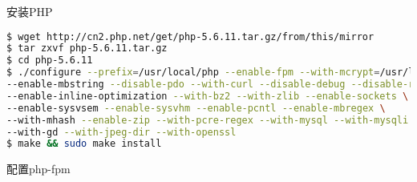 \begin{lstlisting}[language=bash]

\end{lstlisting}




\begin{lstlisting}[language=bash]

\end{lstlisting}









\begin{lstlisting}[language=bash]

\end{lstlisting}



\begin{lstlisting}[language=bash]

\end{lstlisting}








\begin{lstlisting}[language=bash]

\end{lstlisting}

















安装PHP


\begin{lstlisting}[language=bash]
$ wget http://cn2.php.net/get/php-5.6.11.tar.gz/from/this/mirror
$ tar zxvf php-5.6.11.tar.gz
$ cd php-5.6.11
$ ./configure --prefix=/usr/local/php --enable-fpm --with-mcrypt=/usr/local/libmcrypt \
--enable-mbstring --disable-pdo --with-curl --disable-debug --disable-rpath \
--enable-inline-optimization --with-bz2 --with-zlib --enable-sockets \
--enable-sysvsem --enable-sysvhm --enable-pcntl --enable-mbregex \
--with-mhash --enable-zip --with-pcre-regex --with-mysql --with-mysqli \
--with-gd --with-jpeg-dir --with-openssl
$ make && sudo make install
\end{lstlisting}

配置php-fpm


